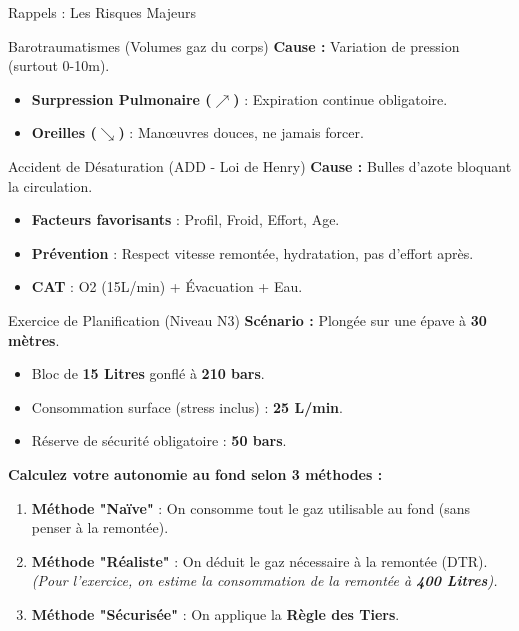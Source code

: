 \begin{frame}{Rappels : Les Risques Majeurs}
    \begin{alertblock}{Barotraumatismes (Volumes gaz du corps)}
        \textbf{Cause :} Variation de pression (surtout 0-10m).
        \begin{itemize}
            \item \textbf{Surpression Pulmonaire ($\nearrow$)} : Expiration continue obligatoire.
            \item \textbf{Oreilles ($\searrow$)} : Manœuvres douces, ne jamais forcer.
        \end{itemize}
    \end{alertblock}

    \begin{block}{Accident de Désaturation (ADD - Loi de Henry)}
        \textbf{Cause :} Bulles d'azote bloquant la circulation.
        \begin{itemize}
            \item \textbf{Facteurs favorisants} : Profil, Froid, Effort, Age.
            \item \textbf{Prévention} : Respect vitesse remontée, hydratation, pas d'effort après.
            \item \textbf{CAT} : O2 (15L/min) + Évacuation + Eau.
        \end{itemize}
    \end{block}
\end{frame}

\begin{frame}{Exercice de Planification (Niveau N3)}
    \textbf{Scénario :}
    Plongée sur une épave à \textbf{30 mètres}.
    \begin{itemize}
        \item Bloc de \textbf{15 Litres} gonflé à \textbf{210 bars}.
        \item Consommation surface (stress inclus) : \textbf{25 L/min}.
        \item Réserve de sécurité obligatoire : \textbf{50 bars}.
    \end{itemize}

    \vspace{0.3cm}
    \textbf{Calculez votre autonomie au fond selon 3 méthodes :}
    \begin{enumerate}
        \item \textbf{Méthode "Naïve"} : On consomme tout le gaz utilisable au fond (sans penser à la remontée).
        \item \textbf{Méthode "Réaliste"} : On déduit le gaz nécessaire à la remontée (DTR).
        \textit{\small(Pour l'exercice, on estime la consommation de la remontée à \textbf{400 Litres}).}
        \item \textbf{Méthode "Sécurisée"} : On applique la \textbf{Règle des Tiers}.
    \end{enumerate}
\end{frame}


